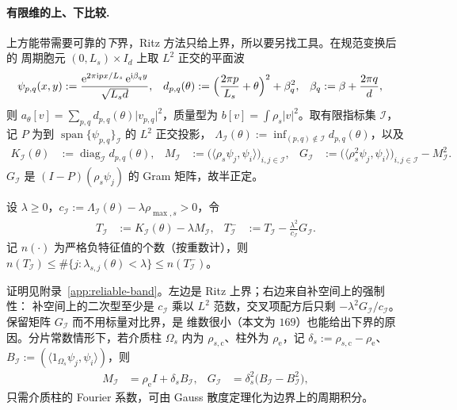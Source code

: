 \paragraph{有限维的上、下比较.}
上方能带需要可靠的\emph{下}界，Ritz 方法只给上界，所以要另找工具。在规范变换后的
周期胞元 $(0,L_s)\times I_d$ 上取 $L^2$ 正交的平面波
\begin{align}
  \psi_{p,q}(x,y)&:=\frac{\mathrm{e}^{2\pi\mathrm{i} px/L_s}\,\mathrm{e}^{\mathrm{i}\beta_qy}}{\sqrt{L_sd}},
  &d_{p,q}(\theta)&:=\Bigl(\frac{2\pi p}{L_s}+\theta\Bigr)^2+\beta_q^2,
  &\beta_q&:=\beta+\frac{2\pi q}{d},
  \label{eq:plane-wave-basis}
\end{align}
则 $a_\theta[v]=\sum_{p,q}d_{p,q}(\theta)\lvert v_{p,q}\rvert^2$，质量型为
$b[v]=\int\rho_s\lvert v\rvert^2$。取有限指标集 $\mathcal I$，记 $P$ 为到
$\operatorname{span}\{\psi_{p,q}\}_{\mathcal I}$ 的 $L^2$ 正交投影，
$\Lambda_{\mathcal I}(\theta):=\inf_{(p,q)\notin\mathcal I}d_{p,q}(\theta)$，以及
\begin{align}
  K_{\mathcal I}(\theta)&:=\operatorname{diag}_{\mathcal I}d_{p,q}(\theta),
  &M_{\mathcal I}&:=\bigl(\langle\rho_s\psi_j,\psi_i\rangle\bigr)_{i,j\in\mathcal I},
  &G_{\mathcal I}&:=\bigl(\langle\rho_s^2\psi_j,\psi_i\rangle\bigr)_{i,j\in\mathcal I}-M_{\mathcal I}^2 .
  \label{eq:fourier-matrices}
\end{align}
$G_{\mathcal I}$ 是 $(I-P)(\rho_s\psi_j)$ 的 Gram 矩阵，故半正定。

\begin{theorem}
  \label{thm:fourier-complement}
  设 $\lambda\geq0$，$c_{\mathcal I}:=\Lambda_{\mathcal I}(\theta)-\lambda\rho_{\max,s}>0$，令
  \begin{align}
    T_{\mathcal I}&:=K_{\mathcal I}(\theta)-\lambda M_{\mathcal I},
    &T_{\mathcal I}^-&:=T_{\mathcal I}-\frac{\lambda^2}{c_{\mathcal I}}G_{\mathcal I}.
    \label{eq:fourier-comparison}
  \end{align}
  记 $n(\cdot)$ 为严格负特征值的个数（按重数计），则
  $n(T_{\mathcal I})\leq\#\{j:\lambda_{s,j}(\theta)<\lambda\}\leq n(T_{\mathcal I}^-)$。
\end{theorem}

证明见附录~\ref{app:reliable-band}。左边是 Ritz 上界；右边来自补空间上的强制性：
补空间上的二次型至少是 $c_{\mathcal I}$ 乘以 $L^2$ 范数，交叉项配方后只剩
$-\lambda^2G_{\mathcal I}/c_{\mathcal I}$。保留矩阵 $G_{\mathcal I}$ 而不用标量对比界，是
维数很小（本文为 $169$）也能给出下界的原因。分片常数情形下，若介质柱 $\Omega_s$ 内为
$\rho_{s,\mathrm c}$、柱外为 $\rho_{\mathrm e}$，记 $\delta_s:=\rho_{s,\mathrm c}-\rho_{\mathrm e}$、
$B_{\mathcal I}:=(\langle1_{\Omega_s}\psi_j,\psi_i\rangle)$，则
\begin{align}
  M_{\mathcal I}&=\rho_{\mathrm e}I+\delta_sB_{\mathcal I},
  &G_{\mathcal I}&=\delta_s^2\bigl(B_{\mathcal I}-B_{\mathcal I}^2\bigr),
  \label{eq:fourier-matrices-piecewise}
\end{align}
只需介质柱的 Fourier 系数，可由 Gauss 散度定理化为边界上的周期积分。

